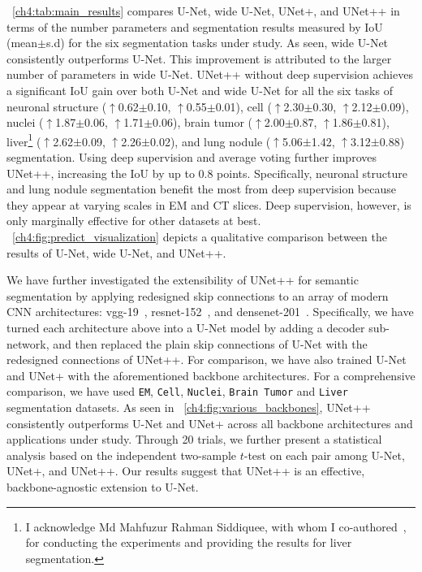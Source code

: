 \tableautorefname~\ref{ch4:tab:main_results} compares U-Net, wide U-Net, UNet+, and UNet++ in terms of the number parameters and segmentation results measured by IoU (mean$\pm$s.d) for the six segmentation tasks under study. As seen, wide U-Net consistently outperforms U-Net. This improvement is attributed to the larger number of parameters in wide U-Net. UNet++ without deep supervision achieves a significant IoU gain over both U-Net and wide U-Net for all the six tasks of neuronal structure ($\uparrow$0.62$\pm$0.10, $\uparrow$0.55$\pm$0.01), cell ($\uparrow$2.30$\pm$0.30, $\uparrow$2.12$\pm$0.09), nuclei ($\uparrow$1.87$\pm$0.06, $\uparrow$1.71$\pm$0.06), brain tumor ($\uparrow$2.00$\pm$0.87, $\uparrow$1.86$\pm$0.81), liver\footnote{I acknowledge Md Mahfuzur Rahman Siddiquee, with whom I co-authored~\citet{zhou2018unet++,zhou2019unet++}, for conducting the experiments and providing the results for liver segmentation.} ($\uparrow$2.62$\pm$0.09, $\uparrow$2.26$\pm$0.02), and lung nodule ($\uparrow$5.06$\pm$1.42, $\uparrow$3.12$\pm$0.88) segmentation. Using deep supervision and average voting further improves UNet++, increasing the IoU by up to 0.8 points. Specifically, neuronal structure and lung nodule segmentation benefit the most from deep supervision because they appear at varying scales in EM and CT slices.
Deep supervision, however, is only marginally effective for other datasets at best.  \figurename~\ref{ch4:fig:predict_visualization} depicts a qualitative comparison between the results of U-Net, wide U-Net, and UNet++. 

We have further investigated the extensibility of UNet++ for semantic segmentation by applying redesigned skip connections to an array of modern CNN architectures: vgg-19~\citep{simonyan2014very}, resnet-152~\citep{he2016deep}, and densenet-201~\citep{huang2017densely}. Specifically, we have turned each architecture above into a U-Net model by adding a decoder sub-network, and then replaced the plain skip connections of U-Net with the redesigned connections of UNet++. For comparison, we have also trained U-Net and  UNet+ with the aforementioned backbone architectures. 
For a comprehensive comparison, we have used \texttt{EM}, \texttt{Cell}, \texttt{Nuclei}, \texttt{Brain Tumor} and \texttt{Liver} segmentation datasets.
As seen in \figurename~\ref{ch4:fig:various_backbones}, UNet++ consistently outperforms U-Net and UNet+ across all backbone architectures and applications under study.
Through 20 trials, we further present a statistical analysis based on the independent two-sample $t$-test on each pair among U-Net, UNet+, and UNet++.
Our results suggest that UNet++ is an effective, backbone-agnostic extension to U-Net. 


